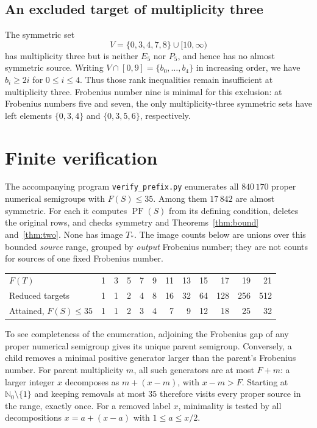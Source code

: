\documentclass[11pt,a4paper]{article}
\theoremstyle{definition}
\theoremstyle{remark}
\newcommand{\N}{\mathbb{N}_0}
\newcommand{\PF}{\operatorname{PF}}
\begin{document}
\subsection{An excluded target of multiplicity three}\label{sec:three-example}
The symmetric set
\[
 V=\{0,3,4,7,8\}\cup[10,\infty)
\]
has multiplicity three but is neither $E_5$ nor $P_5$, and hence has no
almost symmetric source. Writing $V\cap[0,9]=\{b_0,\ldots,b_4\}$ in
increasing order, we have $b_i\geq2i$ for $0\leq i\leq4$.
Thus those rank inequalities remain insufficient at multiplicity three.
Frobenius number nine is minimal for this exclusion: at Frobenius numbers
five and seven, the only multiplicity-three symmetric sets have left
elements $\{0,3,4\}$ and $\{0,3,5,6\}$, respectively.


\section{Finite verification}
The accompanying program \texttt{verify\_prefix.py} enumerates all $840\,170$ proper
numerical semigroups with $F(S)\leq35$. Among them $17\,842$ are
almost symmetric. For each it computes $\PF(S)$ from its defining
condition, deletes the original rows, and checks symmetry and
Theorems~\ref{thm:bound} and~\ref{thm:two}. None has image $T_*$.
The image counts below are unions over this bounded \emph{source}
range, grouped by \emph{output} Frobenius number; they are not counts
for sources of one fixed Frobenius number.
\begin{center}
\setlength{\tabcolsep}{3pt}
\begin{tabular}{lrrrrrrrrrrr}
\toprule
$F(T)$&1&3&5&7&9&11&13&15&17&19&21\\
Reduced targets&1&1&2&4&8&16&32&64&128&256&512\\
Attained, $F(S)\leq35$&1&1&2&3&4&7&9&12&18&25&32\\
\bottomrule
\end{tabular}
\end{center}
To see completeness of the enumeration, adjoining the Frobenius gap
of any proper numerical semigroup gives its unique parent semigroup.
Conversely, a child removes a minimal positive generator larger than
the parent's Frobenius number. For parent multiplicity $m$, all such
generators are at most $F+m$: a larger integer $x$ decomposes as
$m+(x-m)$, with $x-m>F$. Starting at $\N\setminus\{1\}$ and keeping
removals at most $35$ therefore visits every proper source in the range,
exactly once. For a removed label $x$, minimality is tested by all
decompositions $x=a+(x-a)$ with $1\leq a\leq x/2$.
\end{document}
